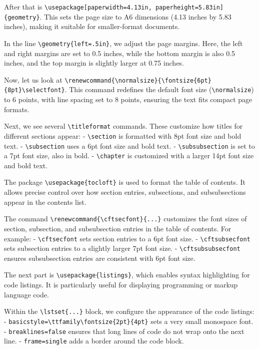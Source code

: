 \documentclass[
]{book}
\theoremstyle{definition}
\theoremstyle{definition}
\theoremstyle{definition}
\theoremstyle{definition}
\theoremstyle{remark}
\begin{document}
After that is \texttt{\textbackslash{}usepackage{[}paperwidth=4.13in,\ paperheight=5.83in{]}\{geometry\}}. This sets the page size to A6 dimensions (4.13 inches by 5.83 inches), making it suitable for smaller-format documents.

In the line \texttt{\textbackslash{}geometry\{left=.5in\}}, we adjust the page margins. Here, the left and right margins are set to 0.5 inches, while the bottom margin is also 0.5 inches, and the top margin is slightly larger at 0.75 inches.

Now, let us look at \texttt{\textbackslash{}renewcommand\{\textbackslash{}normalsize\}\{\textbackslash{}fontsize\{6pt\}\{8pt\}\textbackslash{}selectfont\}}. This command redefines the default font size (\texttt{\textbackslash{}normalsize}) to 6 points, with line spacing set to 8 points, ensuring the text fits compact page formats.

Next, we see several \texttt{\textbackslash{}titleformat} commands. These customize how titles for different sections appear:
- \texttt{\textbackslash{}section} is formatted with 8pt font size and bold text.
- \texttt{\textbackslash{}subsection} uses a 6pt font size and bold text.
- \texttt{\textbackslash{}subsubsection} is set to a 7pt font size, also in bold.
- \texttt{\textbackslash{}chapter} is customized with a larger 14pt font size and bold text.

The package \texttt{\textbackslash{}usepackage\{tocloft\}} is used to format the table of contents. It allows precise control over how section entries, subsections, and subsubsections appear in the contents list.

The command \texttt{\textbackslash{}renewcommand\{\textbackslash{}cftsecfont\}\{...\}} customizes the font sizes of section, subsection, and subsubsection entries in the table of contents. For example:
- \texttt{\textbackslash{}cftsecfont} sets section entries to a 6pt font size.
- \texttt{\textbackslash{}cftsubsecfont} sets subsection entries to a slightly larger 7pt font size.
- \texttt{\textbackslash{}cftsubsubsecfont} ensures subsubsection entries are consistent with 6pt font size.

The next part is \texttt{\textbackslash{}usepackage\{listings\}}, which enables syntax highlighting for code listings. It is particularly useful for displaying programming or markup language code.

Within the \texttt{\textbackslash{}lstset\{...\}} block, we configure the appearance of the code listings:
- \texttt{basicstyle=\textbackslash{}ttfamily\textbackslash{}fontsize\{2pt\}\{4pt\}} sets a very small monospace font.
- \texttt{breaklines=false} ensures that long lines of code do not wrap onto the next line.
- \texttt{frame=single} adds a border around the code block.
\end{document}
